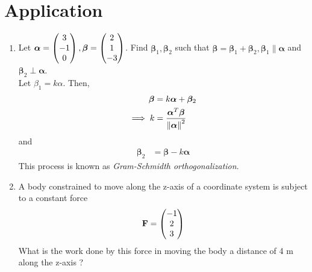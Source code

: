 \documentclass[journal,12pt,twocolumn]{IEEEtran}
\renewcommand\thesection{\arabic{section}}
\begin{document}
\section{Application}
\renewcommand{\theequation}{\theenumi}
\begin{enumerate}[label=\thesection.\arabic*.,ref=\thesection.\theenumi]
\item Let $\bm{\alpha} = \begin{pmatrix}3\\-1\\0\end{pmatrix}, \bm{\beta} = \begin{pmatrix}2\\1\\-3\end{pmatrix}$.  Find $\bm{\beta}_1, \bm{\beta}_2 $ such that $\bm{\beta}=\bm{\beta}_1+\bm{\beta}_2, \bm{\beta}_1 \parallel  \bm{\alpha} $ and $\bm{\beta}_2 \perp \bm{\alpha} $.
%
\label{prob:line_gram_schmidt}
\\
\solution Let $\beta_1 = k\alpha$.  Then, 
%
\begin{align}
\bm{\beta} &= k\bm{\alpha}+\bm{\beta}_2
\\
\implies k &= \frac{\bm{\alpha}^T\bm{\beta}}{\left\lVert\bm{\alpha}\right\rVert^2}
\end{align}
%
and 
%
\begin{align}
\bm{\beta}_2 &= \bm{\beta}-k\bm{\alpha}
\end{align}
%
This process is known as {\em Gram-Schmidth orthogonalization}.

\item A body constrained to move along the z-axis of a coordinate system is subject to a constant force
\begin{align}
\mathbf{F} = \begin{pmatrix}-1\\2\\3\end{pmatrix}
\end{align}
%
What is the work done by this force in moving the body a distance of 4 m along the z-axis ?
\\
\solution 
\end{enumerate}
\end{document}
